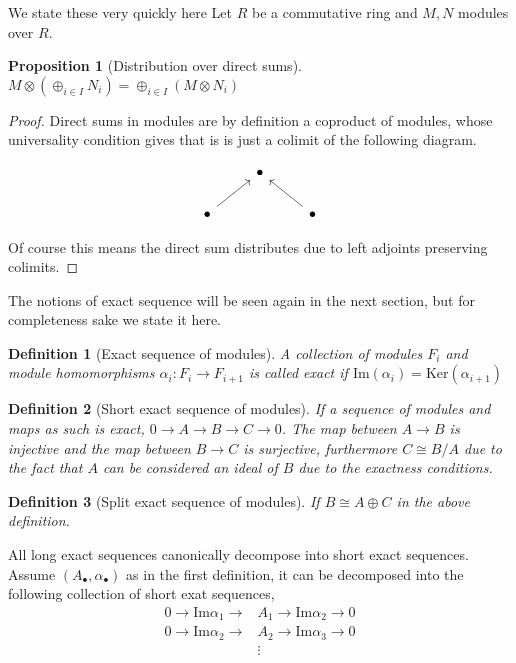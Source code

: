 \documentclass[12pt]{article}
\numberwithin{equation}{section}
\newtheorem{definition}{Definition}[section]
\newtheorem{proposition}{Proposition}[section]
\begin{document}
	We state these very quickly here
	Let $R$ be a commutative ring and $M,N$ modules over $R$.
	\begin{proposition}[Distribution over direct sums]
		\( M \otimes (\oplus_{i \in I}N_i) = \oplus_{i \in I} (M \otimes N_i)\)
	\end{proposition}
	\begin{proof}
		Direct sums in modules are by definition a coproduct of modules, whose universality condition gives that is is just a colimit of the following diagram.
		
		\[\begin{tikzcd}
			& \bullet \\
			\bullet && \bullet
			\arrow[from=2-1, to=1-2]
			\arrow[from=2-3, to=1-2]
		\end{tikzcd}\]
		
		Of course this means the direct sum distributes due to left adjoints preserving colimits.
	\end{proof}
	The notions of exact sequence will be seen again in the next section, but for completeness sake we state it here.
	\begin{definition}[Exact sequence of modules]
		A collection of modules $F_i$ and module homomorphisms $\alpha_i: F_i \to F_{i+1}$ is called exact if $\mathrm{Im}(\alpha_i) = \mathrm{Ker}(\alpha_{i+1})$
	\end{definition}
	\begin{definition}[Short exact sequence of modules] 
		If a sequence of modules and maps as such is exact, $0 \to A \to B \to C \to 0$. The map between $A \to B$ is injective and the map between $B \to C $ is surjective, furthermore $C \cong B/A$ due to the fact that $A $ can be considered an ideal of $B$ due to the exactness conditions.
	\end{definition}
		\begin{definition}[Split exact sequence of modules]
		If $B\cong A\oplus C$ in the above definition.
	\end{definition}
	All long exact sequences canonically decompose into short exact sequences. Assume $(A_\bullet, \alpha_\bullet)$ as in the first definition, it can be decomposed into the following collection of short exat sequences,
	\begin{align*}
		0 \to \mathrm{Im}\alpha_1 \to &A_1 \to \mathrm{Im} \alpha_2 \to 0\\
		0 \to \mathrm{Im} \alpha_2 \to &A_2 \to \mathrm{Im} \alpha_3 \to 0\\
		&\vdots
	\end{align*}
	
\end{document}
